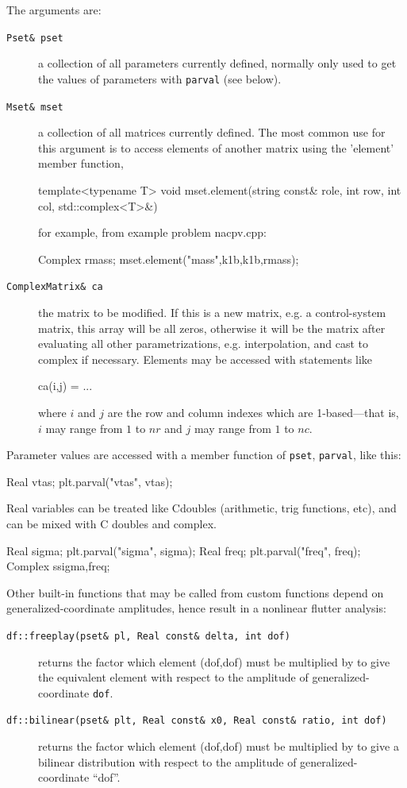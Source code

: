 \documentclass[10pt,openany,twoside]{book}
\numberwithin{equation}{section}   %
\newcommand{\Code}[1]{{\small\tt #1}}
\def\Cpp{{C\nolinebreak[4]\hspace{-.05em}\raisebox{.4ex}{\tiny\bf ++}}\:}
\begin{document}
The arguments are:
\begin{description}
\item[\Code{Pset\& pset}] a collection of all parameters currently defined, normally
   only used to get the values of parameters with \Code{parval} (see below).
\item[\Code{Mset\& mset}] a collection of all matrices currently defined.
	The most common use for this argument is to access elements of another matrix
	using the 'element' member function,
	\begin{example}
	template<typename T>
	void mset.element(string const& role, int row, int col, std::complex<T>&)
	\end{example}
	for example, from example problem nacpv.cpp:
	\begin{example}
	Complex rmass;
	mset.element("mass",k1b,k1b,rmass);
	\end{example}
\item[\Code{ComplexMatrix\& ca}] the matrix to be modified. If this is a
new matrix, e.g. a control-system matrix, this array will be all zeros,
otherwise it will be the matrix after evaluating all other parametrizations,
e.g. interpolation, and cast to complex if necessary. Elements may be accessed
with statements like
\begin{example}
   ca(i,j) = ...
\end{example}
where $i$ and $j$ are the row and column indexes which are 1-based---that is,
$i$ may range from $1$ to $nr$ and $j$ may range from $1$ to $nc$.
\end{description}
\par
Parameter values are accessed with a member function of \Code{pset}, \Code{parval},
like this:
\begin{example}
   Real vtas;
   plt.parval("vtas", vtas);
\end{example}
Real variables can be treated like \Cpp doubles
(arithmetic, trig functions, etc), and can be mixed with \Cpp
doubles and complex.

\begin{example}
   Real sigma;
   plt.parval("sigma", sigma);
   Real freq;
   plt.parval("freq", freq);
   Complex s{sigma,freq};
\end{example}

Other built-in functions that may be called
from custom functions depend on generalized-coordinate amplitudes,
hence result in a nonlinear flutter analysis:
\begin{description}
\item[\Code{df::freeplay(pset\& pl, Real const\& delta, int dof)}]
   returns the factor which element (dof,dof) must be multiplied by to give
   the equivalent element with respect to the amplitude of
	generalized-coordinate \Code{dof}.
\item[\Code{df::bilinear(pset\& plt, Real const\& x0, Real const\& ratio, int dof)}]
returns the factor which element (dof,dof) must be multiplied by to give
a bilinear distribution with respect to the amplitude of generalized-coordinate
``dof''.
\end{description}
\end{document}
